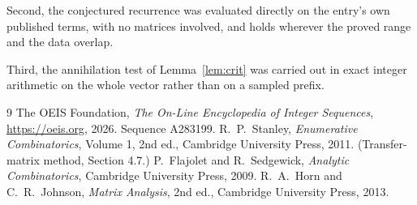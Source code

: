 \documentclass[11pt,a4paper]{article}
\theoremstyle{plain}
\theoremstyle{definition}
\begin{document}
Second, the conjectured recurrence was evaluated directly on the entry's own published terms,
with no matrices involved, and holds wherever the proved range and the data overlap.

Third, the annihilation test of Lemma~\ref{lem:crit} was carried out in exact integer
arithmetic on the whole vector rather than on a sampled prefix.

\begin{thebibliography}{9}
 The OEIS Foundation, \emph{The On-Line Encyclopedia of Integer
Sequences}, \url{https://oeis.org}, 2026. Sequence A283199.
 R.~P.~Stanley, \emph{Enumerative Combinatorics}, Volume 1, 2nd ed.,
Cambridge University Press, 2011. (Transfer-matrix method, Section 4.7.)
 P.~Flajolet and R.~Sedgewick, \emph{Analytic Combinatorics}, Cambridge
University Press, 2009.
 R.~A.~Horn and C.~R.~Johnson, \emph{Matrix Analysis}, 2nd ed., Cambridge
University Press, 2013.
\end{thebibliography}
\end{document}
